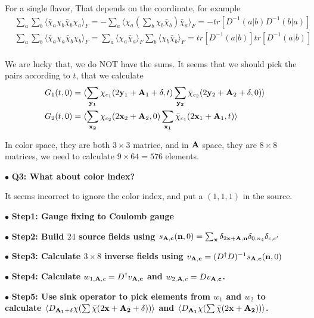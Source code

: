 For a single flavor, That depends on the coordinate, for example
\begin{equation}
\begin{split}
&\sum _a \sum _b\langle \bar{\chi}_a\chi _b \bar{\chi} _b\chi _a\rangle _F = -\sum _a  \langle \chi _a \left(\sum _b \chi _b \bar{\chi} _b\right) \bar{\chi}_a\rangle _F=-tr[D^{-1}(a|b)D^{-1}(b|a)]\\
&\sum _a \sum _b\langle \bar{\chi}_a\chi _a \bar{\chi} _b\chi _b\rangle _F = \sum _a  \langle \chi _a \bar{\chi}_a\rangle _F \sum _b  \langle \chi _b \bar{\chi}_b\rangle _F=tr[D^{-1}(a|b)]tr[D^{-1}(a|b)]\\
\end{split}
\end{equation}

We are lucky that, we do NOT have the sums. It seems that we should pick the pairs according to $t$, that we calculate
\begin{equation}
\begin{split}
&G_1(t,0)=\langle \sum _{\bf y _1}\chi _{c_1} (2{\bf y}_1+{\bf A}_1+\delta,t)  \sum _{\bf y_2}\bar{\chi} _{c_2} (2{\bf y}_2+{\bf A}_2+\delta,0) \rangle\\
&G_2(t,0)=\langle \sum _{\bf x _2} \chi_{c_2}(2{\bf x}_2+{\bf A}_2,0) \sum _{\bf x _1}\bar{\chi}_{c_1}(2{\bf x}_1+{\bf A}_1,t) \rangle\\
\end{split}
\end{equation}

In color space, they are both $3\times 3$ matrice, and in ${\bf A}$ space, they are $8\times 8$ matrices, we need to calculate $9\times 64=576$ elements.

$\bullet$ \textbf{Q3: What about color index?}

It seems incorrect to ignore the color index, and put a $(1,1,1)$ in the source.

$\bullet$ \textbf{Step1: Gauge fixing to Coulomb gauge}

$\bullet$ \textbf{Step2: Build $24$ source fields using $s_{\bf A, c}({\bf n}, 0) = \sum _{{\bf x}} \delta _{2{\bf x}+{\bf A},{\bf n}}\delta _{0,n_4}\delta_{c,c'}$}

$\bullet$ \textbf{Step3: Calculate $3\times 8$ inverse fields using $v _{\bf A, c}=(D^{\dagger}D)^{-1}s_{\bf A, c}({\bf n}, 0)$}

$\bullet$ \textbf{Step4: Calculate $w_{1,{\bf A},c}=D^{\dagger}v _{\bf A, c}$ and $w_{2,{\bf A},c}=Dv _{\bf A, c}$.}

$\bullet$ \textbf{Step5: Use sink operator to pick elements from $w_1$ and $w_2$ to calculate $\langle D_{\bf A_1+\delta}\chi (\sum \bar{\chi}(2{\bf x}+{\bf A_2}+\delta))\rangle$ and $\langle D_{\bf A_1}\chi (\sum \bar{\chi}(2{\bf x}+{\bf A_2}))\rangle$.}

